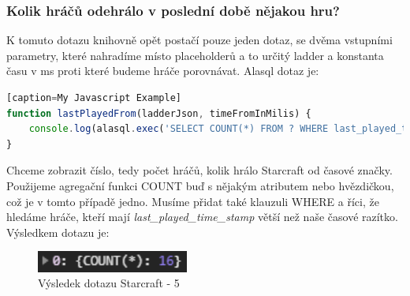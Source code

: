 \documentclass[a4, titlepage]{article}
\begin{document}
\subsubsection{Kolik hráčů odehrálo v poslední době nějakou hru?}
K tomuto dotazu knihovně opět postačí pouze jeden dotaz, se dvěma vstupními parametry, které nahradíme místo placeholderů a to určitý ladder a konstanta času v ms proti které budeme hráče porovnávat. Alasql dotaz je:
\begin{lstlisting}[language=JavaScript][caption=My Javascript Example]
function lastPlayedFrom(ladderJson, timeFromInMilis) {
    console.log(alasql.exec('SELECT COUNT(*) FROM ? WHERE last_played_time_stamp > ?', [ladderJson.team, timeFromInMilis]));
}
\end{lstlisting}
Chceme zobrazit číslo, tedy počet hráčů, kolik hrálo Starcraft od časové značky. Použijeme agregační funkci COUNT buď s nějakým atributem nebo hvězdičkou, což je v tomto případě jedno. Musíme přidat také klauzuli WHERE a říci, že hledáme hráče, kteří mají \textit{last\_played\_time\_stamp} větší než naše časové razítko. Výsledkem dotazu je:
\begin{figure}[h]
    \centering
    \includegraphics[width=5cm]{S5}
    \caption{Výsledek dotazu Starcraft - 5}
\end{figure} 
\newpage
\end{document}
